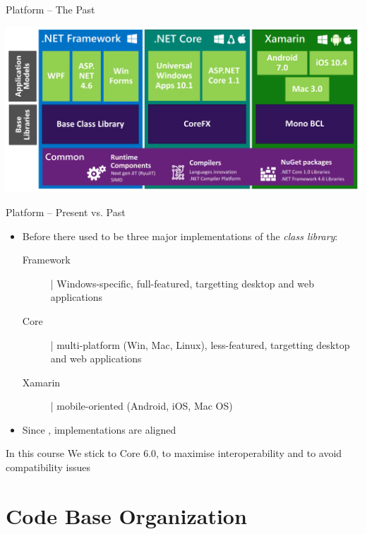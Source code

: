 \documentclass[presentation]{beamer}
\begin{document}
\begin{frame}{\dotnet Platform -- The Past}
    \begin{center}
        \includegraphics[width=\linewidth]{img/dotnet-overview-past.png}
    \end{center}
\end{frame}

\begin{frame}{\dotnet Platform -- Present vs. Past}
    \begin{itemize}
        \item Before  there used to be three major implementations of the \emph{class library}:
        \begin{description}
            \item[\dotnet Framework] | Windows-specific, full-featured, targetting desktop and web applications
            \item[\dotnet Core] | multi-platform (Win, Mac, Linux), less-featured, targetting desktop and web applications
            \item[Xamarin] | mobile-oriented (Android, iOS, Mac OS) 
        \end{description}

        \vfill

        \item Since , implementations are aligned
    \end{itemize}

    \vfill

    \begin{alertblock}{In this course}\centering
        We stick to \alert{\dotnet Core 6.0}, to maximise interoperability and to avoid compatibility issues
    \end{alertblock}
\end{frame}

\section{Code Base Organization}
\end{document}
